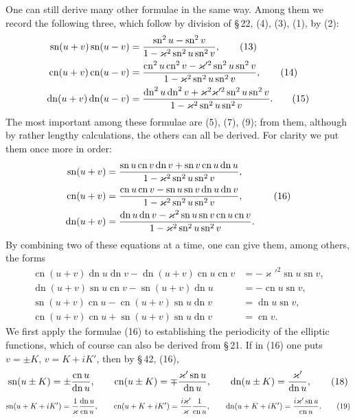 \documentclass[11pt]{article}
\providecommand{\sn}{\operatorname{sn}}
\providecommand{\cn}{\operatorname{cn}}
\providecommand{\dn}{\operatorname{dn}}
\begin{document}
One can still derive many other formulae in the same way. Among them we record the following three, which follow by division of \S\,22, (4), (3), (1), by (2):
\begin{align}
\sn(u+v)\sn(u-v)&={\sn^2u-\sn^2v\over 1-\varkappa^2\sn^2u\sn^2v}, \tag{13}\\
\cn(u+v)\cn(u-v)&={\cn^2u\cn^2v-\varkappa'^2\sn^2u\sn^2v\over 1-\varkappa^2\sn^2u\sn^2v}, \tag{14}\\
\dn(u+v)\dn(u-v)&={\dn^2u\dn^2v+\varkappa^2\varkappa'^2\sn^2u\sn^2v\over 1-\varkappa^2\sn^2u\sn^2v}. \tag{15}
\end{align}
The most important among these formulae are (5), (7), (9); from them, although by rather lengthy calculations, the others can all be derived. For clarity we put them once more in order:
\begin{equation}
\begin{aligned}
\sn(u+v)&={\sn u\cn v\dn v+\sn v\cn u\dn u
\over 1-\varkappa^2\sn^2u\sn^2v},\\
\cn(u+v)&={\cn u\cn v-\sn u\sn v\dn u\dn v
\over 1-\varkappa^2\sn^2u\sn^2v},\\
\dn(u+v)&={\dn u\dn v-\varkappa^2\sn u\sn v\cn u\cn v
\over 1-\varkappa^2\sn^2u\sn^2v}.
\end{aligned}
\tag{16}
\end{equation}
By combining two of these equations at a time, one can give them, among others, the forms
\begin{equation}
\begin{aligned}
\cn(u+v)\dn u\dn v-\dn(u+v)\cn u\cn v&=-\varkappa'^2\sn u\sn v,\\
\dn(u+v)\sn u\cn v-\sn(u+v)\dn u&=-\cn u\sn v,\\
\sn(u+v)\cn u-\cn(u+v)\sn u\dn v&=\dn u\sn v,\\
\cn(u+v)\cn u+\sn(u+v)\sn u\dn v&=\cn v.
\end{aligned}
\tag{17}
\end{equation}
We first apply the formulae (16) to establishing the periodicity of the elliptic functions, which of course can also be derived from \S\,21. If in (16) one puts $v=\pm K$, $v=K+iK'$, then by \S\,42, (16),
\begin{equation}
\sn(u\pm K)=\pm{\cn u\over\dn u},
\qquad
\cn(u\pm K)=\mp{\varkappa'\sn u\over\dn u},
\qquad
\dn(u\pm K)={\varkappa'\over\dn u},
\tag{18}
\end{equation}
\begin{equation}
\sn(u+K+iK')={1\over\varkappa}{\dn u\over\cn u},
\qquad
\cn(u+K+iK')={i\varkappa'\over\varkappa}{1\over\cn u},
\qquad
\dn(u+K+iK')={i\varkappa'\sn u\over\cn u}.
\tag{19}
\end{equation}
\end{document}
